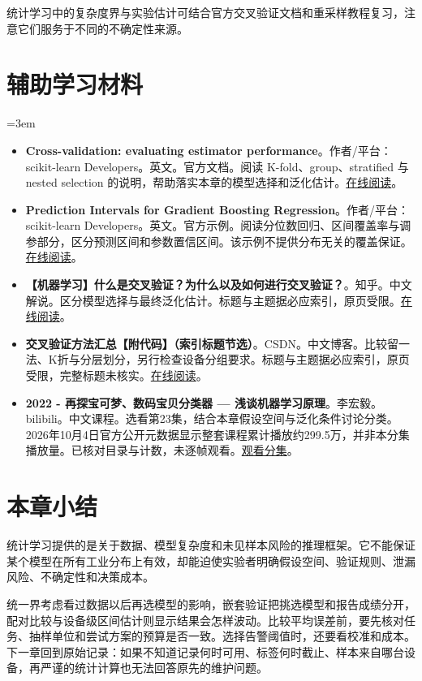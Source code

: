 统计学习中的复杂度界与实验估计可结合官方交叉验证文档和重采样教程复习，注意它们服务于不同的不确定性来源。
\section*{辅助学习材料}
\begingroup
\emergencystretch=3em
\begin{itemize}
\item \textbf{Cross-validation: evaluating estimator performance}。作者/平台：scikit-learn Developers。英文。官方文档。阅读 K-fold、group、stratified 与 nested selection 的说明，帮助落实本章的模型选择和泛化估计。\href{https://scikit-learn.org/stable/modules/cross\_validation.html}{在线阅读}。
\item \textbf{Prediction Intervals for Gradient Boosting Regression}。作者/平台：scikit-learn Developers。英文。官方示例。阅读分位数回归、区间覆盖率与调参部分，区分预测区间和参数置信区间。该示例不提供分布无关的覆盖保证。\href{https://scikit-learn.org/stable/auto\_examples/ensemble/plot\_gradient\_boosting\_quantile.html}{在线阅读}。
\item \textbf{【机器学习】什么是交叉验证？为什么以及如何进行交叉验证？}。知乎。中文解说。区分模型选择与最终泛化估计。标题与主题据必应索引，原页受限。\href{https://zhuanlan.zhihu.com/p/81738187251}{在线阅读}。
\item \textbf{交叉验证方法汇总【附代码】（索引标题节选）}。CSDN。中文博客。比较留一法、K折与分层划分，另行检查设备分组要求。标题与主题据必应索引，原页受限，完整标题未核实。\href{https://blog.csdn.net/WHYbeHERE/article/details/108192957}{在线阅读}。
\item \textbf{2022 - 再探宝可梦、数码宝贝分类器 — 浅谈机器学习原理}。李宏毅。bilibili。中文课程。选看第23集，结合本章假设空间与泛化条件讨论分类。2026年10月4日官方公开元数据显示整套课程累计播放约299.5万，并非本分集播放量。已核对目录与计数，未逐帧观看。\href{https://www.bilibili.com/video/BV1Wv411h7kN/?p=23}{观看分集}。
\end{itemize}
\endgroup
\section{本章小结}
统计学习提供的是关于数据、模型复杂度和未见样本风险的推理框架。它不能保证某个模型在所有工业分布上有效，却能迫使实验者明确假设空间、验证规则、泄漏风险、不确定性和决策成本。

统一界考虑看过数据以后再选模型的影响，嵌套验证把挑选模型和报告成绩分开，配对比较与设备级区间估计则显示结果会怎样波动。比较平均误差前，要先核对任务、抽样单位和尝试方案的预算是否一致。选择告警阈值时，还要看校准和成本。下一章回到原始记录：如果不知道记录何时可用、标签何时截止、样本来自哪台设备，再严谨的统计计算也无法回答原先的维护问题。
